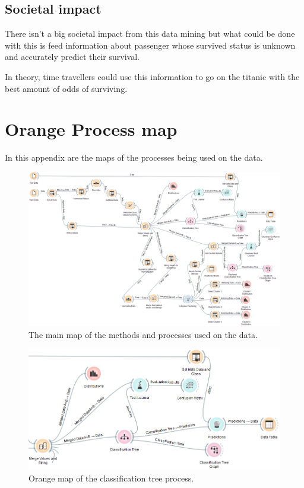 \documentclass[a4paper,11pt]{article}
\begin{document}
\subsection{Societal impact}
There isn't a big societal impact from this data mining but what could be done with this is feed information about passenger whose survived status is unknown and accurately predict their survival.

In theory, time travellers could use this information to go on the titanic with the best amount of odds of surviving.


\clearpage
\appendix
\section{Orange Process map}
\label{appenOrange}
In this appendix are the maps of the processes being used on the data.
\begin{figure}[h]
	\centering
	\includegraphics[scale=0.35]{orangeMap}
	\caption{The main map of the methods and processes used on the data.}
	\label{OrangeMap}
\end{figure}


\begin{figure}[h]
\begin{center}
\includegraphics[scale=0.5]{ClassificationTreeOrange}
\end{center}
\caption{Orange map of the classification tree process.}
\label{classTreeMap}
\end{figure}
\clearpage
\end{document}
